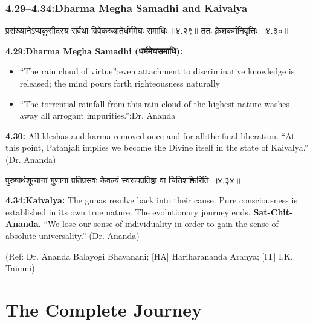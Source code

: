 \begin{frame}[fragile]\frametitle{4.29–4.34:Dharma Megha Samadhi and Kaivalya}

\begin{sanskrit}
प्रसंख्यानेऽप्यकुसीदस्य सर्वथा विवेकख्यातेर्धर्ममेघः समाधिः ॥४.२९॥
ततः क्लेशकर्मनिवृत्तिः ॥४.३०॥
\end{sanskrit}

\textbf{4.29:Dharma Megha Samadhi (धर्ममेघसमाधि):}
\begin{itemize}
\item ``The rain cloud of virtue'':even attachment to discriminative knowledge is released; the mind pours forth righteousness naturally
\item ``The torrential rainfall from this rain cloud of the highest nature washes away all arrogant impurities.'':Dr. Ananda
\end{itemize}

\textbf{4.30:} All kleshas and karma removed once and for all:the final liberation. ``At this point, Patanjali implies we become the Divine itself in the state of Kaivalya.'' (Dr. Ananda)

\begin{sanskrit}
पुरुषार्थशून्यानां गुणानां प्रतिप्रसवः कैवल्यं स्वरूपप्रतिष्ठा वा चितिशक्तिरिति ॥४.३४॥
\end{sanskrit}

\textbf{4.34:Kaivalya:} The gunas resolve back into their cause. Pure consciousness is established in its own true nature. The evolutionary journey ends. \textbf{Sat-Chit-Ananda}. ``We lose our sense of individuality in order to gain the sense of absolute universality.'' (Dr. Ananda)

\tiny{(Ref: Dr. Ananda Balayogi Bhavanani; [HA] Hariharananda Aranya; [IT] I.K. Taimni)}

\end{frame}

\section[Conclusion]{The Complete Journey}

